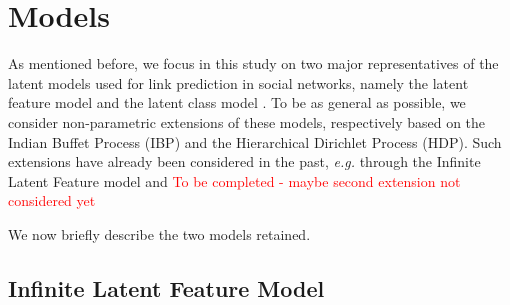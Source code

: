\section{Models}
\label{sec:models}

As mentioned before, we focus in this study on two major representatives of the latent models used for link prediction in social networks, namely the latent feature model \cite{BMF} and the latent class model \cite{MMSB}. To be as general as possible, we consider non-parametric extensions of these models, respectively based on the Indian Buffet Process (IBP) and the Hierarchical Dirichlet Process (HDP). Such extensions have already been considered in the past, {\it e.g.} through the Infinite Latent Feature model \cite{ILFRM} and \textcolor{red}{To be completed - maybe second extension not considered yet}

We now briefly describe the two models retained.


\subsection{Infinite Latent Feature Model}

